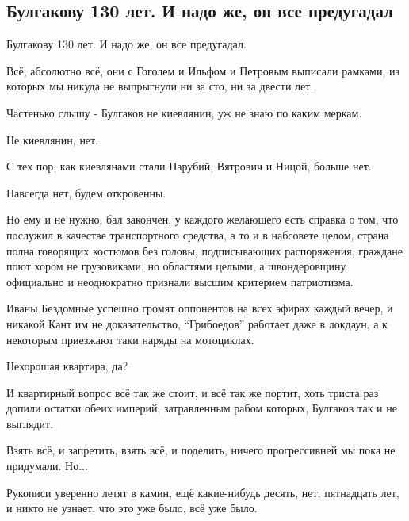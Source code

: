  
 
 
 
 
\subsection{Булгакову 130 лет.  И надо же, он все предугадал}
\label{sec:15_05_2021.fb.buzhanskii_maksim.1.bulgakov}

Булгакову 130 лет. И надо же, он все предугадал.

Всё, абсолютно всё, они с Гоголем и Ильфом и Петровым выписали рамками, из
которых мы никуда не выпрыгнули ни за сто, ни за двести лет.

Частенько слышу - Булгаков не киевлянин, уж не знаю по каким меркам.

Не киевлянин, нет.

С тех пор, как киевлянами стали Парубий, Вятрович и Ницой, больше нет.

Навсегда нет, будем откровенны.

Но ему и не нужно, бал закончен, у каждого желающего есть справка о том, что
послужил в качестве транспортного средства, а то и в набсовете целом, страна
полна говорящих костюмов без головы, подписывающих распоряжения, граждане поют
хором не грузовиками, но областями целыми, а швондеровщину официально и
неоднократно признали высшим критерием патриотизма.

Иваны Бездомные успешно громят оппонентов на всех эфирах каждый вечер, и
никакой Кант им не доказательство, \enquote{Грибоедов} работает даже в локдаун, а к
некоторым приезжают таки наряды на мотоциклах.

Нехорошая квартира, да?

И квартирный вопрос всё так же стоит, и всё так же портит, хоть триста раз
допили остатки обеих империй, затравленным рабом которых, Булгаков так и не
выглядит.

Взять всё, и запретить, взять всё, и поделить, ничего прогрессивней мы пока не
придумали.  Но...

Рукописи уверенно летят в камин, ещё какие-нибудь десять, нет, пятнадцать лет,
и никто не узнает, что это уже было, всё уже было.

